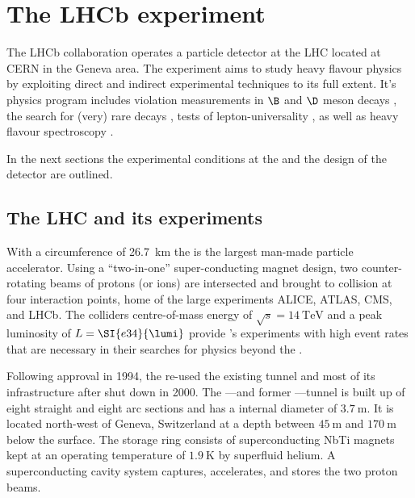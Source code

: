 
\chapter{The \acs*{LHCb} experiment}
\label{ch:lhcb_experiment}

The \acs*{LHCb} collaboration operates a particle detector at the \acs*{LHC}
located at \acs*{CERN} in the Geneva area. The \LHCb experiment aims to study heavy
flavour physics by exploiting direct and indirect experimental techniques to its
full extent. It's physics program includes \CP violation measurements in $\B$ and
$\D$ meson decays
\cite{Aaij:2015tza,Aaij:2015yda,Aaij:2014uva,Aaij:2014fba,Aaij:2014dka,Aaij:2014zsa}, 
the search for (very) rare decays \cite{CMS:2014xfa}, tests of
lepton-universality \cite{Aaij:2014ora,Aaij:2015yra}, as well as heavy flavour
spectroscopy \cite{Aaij:2014yka,LHCB-PAPER-2015-029}.

In the next sections the experimental conditions at the \LHC and the design
of the \LHCb detector are outlined.

\section{The \acs*{LHC} and its experiments}
\label{sec:lhcb_experiment:lhc}

With a circumference of \SI{26.7}{\kilo\metre} the \LHC is the largest man-made
particle accelerator. Using a \enquote{two-in-one} super-conducting magnet
design, two counter-rotating beams of protons (or ions) are intersected and
brought to collision at four interaction points, home of the large \LHC
experiments \acs*{ALICE}, \acs*{ATLAS}, \acs*{CMS}, and \acs*{LHCb}. The
colliders centre-of-mass energy of $\sqrt{s}=\SI{14}{\TeV}$ and a peak
luminosity of $L=\SI{e34}{\lumi}$ provide \LHC's experiments with high event
rates that are necessary in their searches for physics beyond the \SM.

Following approval in 1994, the \LHC re-used the existing \LEP tunnel and most
of its infrastructure after \LEP shut down in 2000. The \LHC---and former
\LEP---tunnel is built up of eight straight and eight arc sections and has a
internal diameter of $\SI{3.7}{\metre}$. It is located north-west of Geneva,
Switzerland at a depth between $\SI{45}{\metre}$ and $\SI{170}{\metre}$ below
the surface. The storage ring consists of superconducting NbTi magnets kept at
an operating temperature of $\SI{1.9}{\kelvin}$ by superfluid helium. A
superconducting \RF cavity system captures, accelerates, and stores the two
proton beams.

